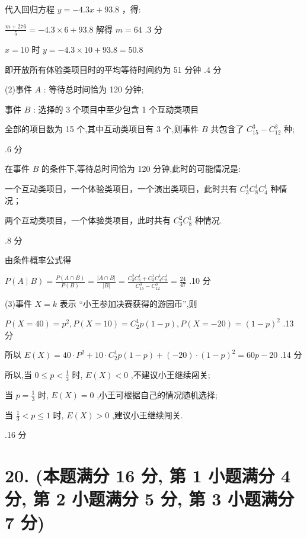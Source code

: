 \documentclass[10pt]{article}
\newcommand*\circled[1]{\tikz[baseline=(char.base)]{\node[shape=circle,draw,inner sep=1.5pt] (char) {\small #1};}}
\begin{document}
代入回归方程 \(y =  - {4.3x} + {93.8}\) ，得:

\(\frac{m + {276}}{5} =  - {4.3} \times  6 + {93.8}\) 解得 \(m = {64}\) .3 分

\(x = {10}\) 时 \(y =  - {4.3} \times  {10} + {93.8} = {50.8}\)

即开放所有体验类项目时的平均等待时间约为 51 分钟 .4 分

(2)事件 \(A\) : 等待总时间恰为 120 分钟;

事件 \(B\) : 选择的 3 个项目中至少包含 1 个互动类项目

全部的项目数为 15 个,其中互动类项目有 3 个,则事件 \(B\) 共包含了 \({C}_{15}^{3} - {C}_{12}^{3}\) 种;

.6 分

在事件 \(B\) 的条件下,等待总时间恰为 120 分钟,此时的可能情况是:

 \circled{1} 一个互动类项目，一个体验类项目，一个演出类项目，此时共有 \({C}_{3}^{1}{C}_{8}^{1}{C}_{4}^{1}\) 种情况；

 \circled{2} 两个互动类项目，一个体验类项目，此时共有 \({C}_{3}^{2}{C}_{8}^{1}\) 种情况.

.8 分

由条件概率公式得

\(P\left( {A \mid  B}\right)  = \frac{P\left( {A \cap  B}\right) }{P\left( B\right) } = \frac{\left| A \cap  B\right| }{\left| B\right| } = \frac{{C}_{3}^{2}{C}_{8}^{1} + {C}_{3}^{1}{C}_{4}^{1}{C}_{8}^{1}}{{C}_{15}^{3} - {C}_{12}^{3}} = \frac{24}{47}\) .10 分

(3)事件 \(X = k\) 表示 “小王参加决赛获得的游园币”,则

\(P\left( {X = {40}}\right)  = {p}^{2},P\left( {X = {10}}\right)  = {C}_{2}^{1}p\left( {1 - p}\right) ,P\left( {X =  - {20}}\right)  = {\left( 1 - p\right) }^{2}\) .13 分

所以 \(E\left( X\right)  = {40} \cdot  {P}^{2} + {10} \cdot  {C}_{2}^{1}p\left( {1 - p}\right)  + \left( {-{20}}\right)  \cdot  {\left( 1 - p\right) }^{2} = {60p} - {20}\) .14 分

所以,当 \(0 \leq  p < \frac{1}{3}\) 时, \(E\left( X\right)  < 0\) ,不建议小王继续闯关;

当 \(p = \frac{1}{3}\) 时, \(E\left( X\right)  = 0\) ,小王可根据自己的情况随机选择;

当 \(\frac{1}{3} < p \leq  1\) 时, \(E\left( X\right)  > 0\) ,建议小王继续闯关.

.16 分

\section*{20. (本题满分 16 分, 第 1 小题满分 4 分, 第 2 小题满分 5 分, 第 3 小题满分 7 分)}
\end{document}
